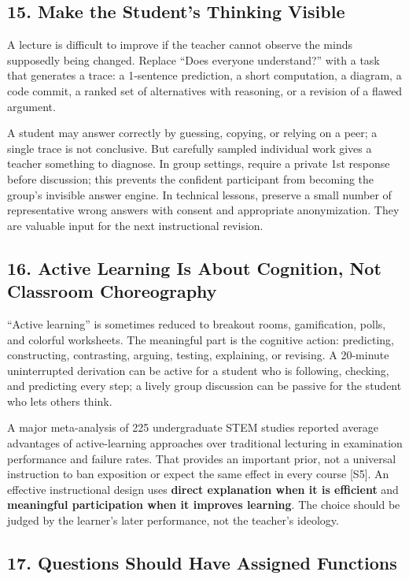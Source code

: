 \subsection*{15. Make the Student's Thinking Visible}

A lecture is difficult to improve if the teacher cannot observe the minds supposedly being changed. Replace ``Does everyone understand?'' with a task that generates a trace: a 1-sentence prediction, a short computation, a diagram, a code commit, a ranked set of alternatives with reasoning, or a revision of a flawed argument.

A student may answer correctly by guessing, copying, or relying on a peer; a single trace is not conclusive. But carefully sampled individual work gives a teacher something to diagnose. In group settings, require a private 1st response before discussion; this prevents the confident participant from becoming the group's invisible answer engine. In technical lessons, preserve a small number of representative wrong answers with consent and appropriate anonymization. They are valuable input for the next instructional revision.

\subsection*{16. Active Learning Is About Cognition, Not Classroom Choreography}

``Active learning'' is sometimes reduced to breakout rooms, gamification, polls, and colorful worksheets. The meaningful part is the cognitive action: predicting, constructing, contrasting, arguing, testing, explaining, or revising. A 20-minute uninterrupted derivation can be active for a student who is following, checking, and predicting every step; a lively group discussion can be passive for the student who lets others think.

A major meta-analysis of 225 undergraduate STEM studies reported average advantages of active-learning approaches over traditional lecturing in examination performance and failure rates. That provides an important prior, not a universal instruction to ban exposition or expect the same effect in every course [S5]. An effective instructional design uses \textbf{direct explanation when it is efficient} and \textbf{meaningful participation when it improves learning}. The choice should be judged by the learner's later performance, not the teacher's ideology.

\subsection*{17. Questions Should Have Assigned Functions}


